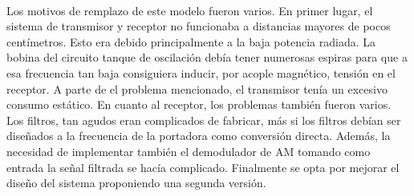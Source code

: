 \paragraph{}
Los motivos de remplazo de este modelo fueron varios.
En primer lugar, el sistema de transmisor y receptor no funcionaba a distancias mayores de pocos centímetros. Esto era debido principalmente a la baja potencia radiada. La bobina del circuito tanque de oscilación debía tener numerosas espiras para que a esa frecuencia tan baja consiguiera inducir, por acople magnético, tensión en el receptor.
A parte de el problema mencionado, el transmisor tenía un excesivo consumo estático. En cuanto al receptor, los problemas también fueron varios. Los filtros, tan agudos eran complicados de fabricar, más si los filtros debían ser diseñados a la frecuencia de la portadora como conversión directa. Además, la necesidad de implementar también el demodulador de AM tomando como entrada la señal filtrada se hacía complicado.
Finalmente se opta por mejorar el diseño del sistema proponiendo una segunda versión.
